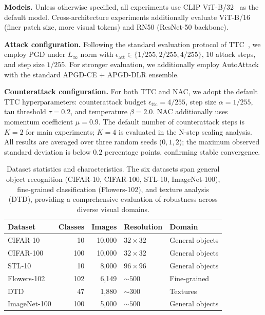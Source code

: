 \documentclass[pdflatex,sn-basic,Numbered]{sn-jnl}
\theoremstyle{thmstyleone}
\theoremstyle{thmstyletwo}
\theoremstyle{thmstylethree}
\begin{document}
\textbf{Models.} Unless otherwise specified, all experiments use CLIP ViT-B/32~\cite{radford2021clip} as the default model. Cross-architecture experiments additionally evaluate ViT-B/16 (finer patch size, more visual tokens) and RN50 (ResNet-50 backbone).

\textbf{Attack configuration.} Following the standard evaluation protocol of TTC~\cite{xing2025clip}, we employ PGD under $L_\infty$ norm with $\epsilon_{\text{att}} \in \{1/255, 2/255, 4/255\}$, $10$ attack steps, and step size $1/255$. For stronger evaluation, we additionally employ AutoAttack~\cite{croce2020reliable} with the standard APGD-CE + APGD-DLR ensemble.

\textbf{Counterattack configuration.} For both TTC and NAC, we adopt the default TTC hyperparameters: counterattack budget $\epsilon_{\text{ttc}} = 4/255$, step size $\alpha = 1/255$, tau threshold $\tau = 0.2$, and temperature $\beta = 2.0$. NAC additionally uses momentum coefficient $\mu = 0.9$. The default number of counterattack steps is $K=2$ for main experiments; $K=4$ is evaluated in the N-step scaling analysis. All results are averaged over three random seeds ($0, 1, 2$); the maximum observed standard deviation is below $0.2$ percentage points, confirming stable convergence.

\begin{table}[ht]\centering\small
\caption{Dataset statistics and characteristics. The six datasets span general object recognition (CIFAR-10, CIFAR-100, STL-10, ImageNet-100), fine-grained classification (Flowers-102), and texture analysis (DTD), providing a comprehensive evaluation of robustness across diverse visual domains.}\label{tab:datasets}
\begin{tabular}{@{}lrrll@{}}
\toprule Dataset & Classes & Images & Resolution & Domain \\
\midrule CIFAR-10 & 10 & 10,000 & $32\times32$ & General objects \\
CIFAR-100 & 100 & 10,000 & $32\times32$ & General objects \\
STL-10 & 10 & 8,000 & $96\times96$ & General objects \\
Flowers-102 & 102 & 6,149 & ${\sim}500$ & Fine-grained \\
DTD & 47 & 1,880 & ${\sim}300$ & Textures \\
ImageNet-100 & 100 & 5,000 & ${\sim}500$ & General objects \\
\bottomrule
\end{tabular}
\end{table}
\end{document}

